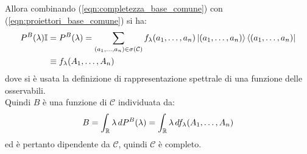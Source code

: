 \documentclass[../../FisicaTeorica.tex]{subfiles}
\begin{document}
Allora combinando (\ref{eqn:completezza_base_comune}) con (\ref{eqn:proiettori_base_comune}) si ha:
\begin{align*}
P^B(\lambda)\mathbb{I} &= P^B(\lambda)=\sum_{(a_1, \dots, a_n)\in \sigma(\mathcal{C})} f_\lambda(a_1, \dots, a_n)\Ket{(a_1, \dots, a_n)}\Bra{(a_1, \dots, a_n)}\\ 
&\equiv f_\lambda(A_1,\dots, A_n)
\end{align*} %
dove si è usata la definizione di rappresentazione spettrale di una funzione delle osservabili.\\
Quindi $B$ è una funzione di $\mathcal{C}$ individuata da:
\[
B=\int_{\mathbb{R}} \lambda\,dP^B(\lambda) =\int_{\mathbb{R}} \lambda\,df_\lambda(A_1,\dots, A_n)
\] 
ed è pertanto dipendente da $\mathcal{C}$, quindi $\mathcal{C}$ è completo.\\
\end{document}
